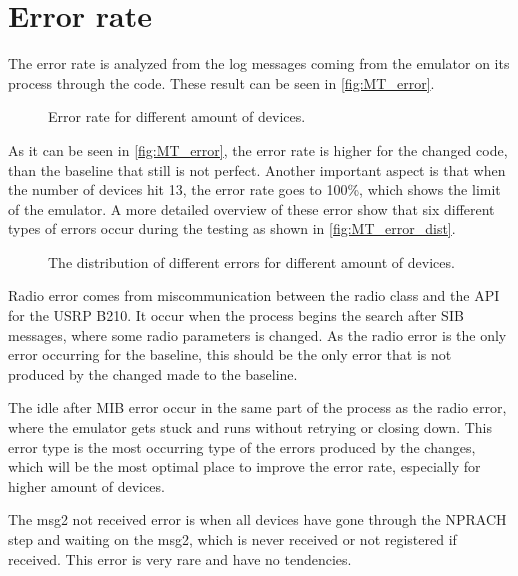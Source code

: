 \section{Error rate}
\label{sec:MTerror}
The error rate is analyzed from the log messages coming from the emulator on its process through the code. These result can be seen in \autoref{fig:MT_error}.

\begin{figure}[H]
\centering
\resizebox{0.5\textwidth}{!}{
}
\caption{Error rate for different amount of devices.}
\label{fig:MT_error}
\end{figure}

As it can be seen in \autoref{fig:MT_error}, the error rate is higher for the changed code, than the baseline that still is not perfect. Another important aspect is that when the number of devices hit 13, the error rate goes to 100\%, which shows the limit of the emulator. A more detailed overview of these error show that six different types of errors occur during the testing as shown in \autoref{fig:MT_error_dist}.

\begin{figure}[H]
\centering
\resizebox{0.9\textwidth}{!}{
}
\caption{The distribution of different errors for different amount of devices.}
\label{fig:MT_error_dist}
\end{figure}

Radio error comes from miscommunication between the radio class and the API for the USRP B210. It occur when the process begins the search after  SIB messages, where some radio parameters is changed. As the radio error is the only error occurring for the baseline, this should be the only error that is not produced by the changed made to the baseline.

The idle after MIB error occur in the same part of the process as the radio error, where the emulator gets stuck and runs without retrying or closing down. This error type is the most occurring type of the errors produced by the changes, which will be the most optimal place to improve the error rate, especially for higher amount of devices.

The msg2 not received error is when all devices have gone through the NPRACH step and waiting on the msg2, which is never received or not registered if received. This error is very rare and have no tendencies.


